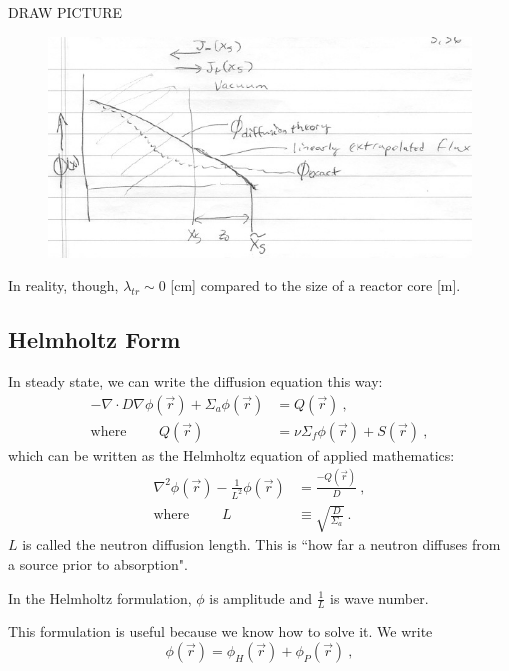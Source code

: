 \documentclass[12pt]{article}
\begin{document}
DRAW PICTURE
%
\begin{figure}[h!]
\begin{center}
\includegraphics[height=3 in]{../figs/DiffusionBC}
\end{center}
\end{figure}

In reality, though, $\lambda_{tr} \sim 0$ [cm] compared to the size of a reactor core [m]. 


\subsection*{Helmholtz Form}
In steady state, we can write the diffusion equation this way:
%
\begin{align*}
-\nabla \cdot D\nabla \phi(\vec{r}) + 
\Sigma_a \phi(\vec{r}) &= Q(\vec{r})\:, \\
%
\text{where }\qquad Q(\vec{r}) &=
\nu \Sigma_f \phi(\vec{r}) +
S(\vec{r})\:,
\end{align*}
%
which can be written as the Helmholtz equation of applied mathematics:
%
\begin{align*}
\nabla^2 \phi(\vec{r}) - \frac{1}{L^2}\phi(\vec{r}) &= \frac{-Q(\vec{r})}{D}\:, \\
\text{where }\qquad L &\equiv \sqrt{\frac{D}{\Sigma_a}}\:.
\end{align*}
%
$L$ is called the neutron diffusion length. This is ``how far a neutron diffuses from a source prior to absorption". 

In the Helmholtz formulation, $\phi$ is amplitude and $\frac{1}{L}$ is wave number. 

This formulation is useful because we know how to solve it. We write
\[\phi(\vec{r}) = \phi_H(\vec{r}) + \phi_P(\vec{r}) \:,\]
\end{document}
